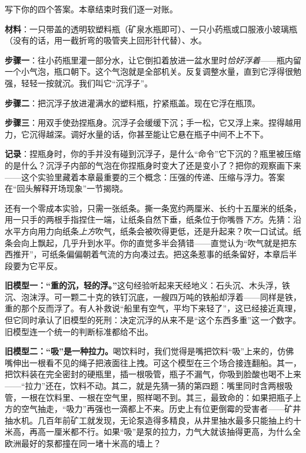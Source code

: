 写下你的四个答案。本章结束时我们逐一对账。


\begin{experiment}
\textbf{材料}：一只带盖的透明软塑料瓶（矿泉水瓶即可）、一只小药瓶或口服液小玻璃瓶（没有的话，用一截折弯的吸管夹上回形针代替）、水。

\textbf{步骤一}：往小药瓶里灌一部分水，让它倒扣着放进一盆水里时\emph{恰好浮着}——瓶内留一个小气泡，瓶口朝下。这个气泡就是全部机关。反复调整水量，直到它浮得很勉强，轻轻一按就沉。我们叫它“沉浮子”。

\textbf{步骤二}：把沉浮子放进灌满水的塑料瓶，拧紧瓶盖。现在它浮在瓶顶。

\textbf{步骤三}：用双手使劲捏瓶身。沉浮子会缓缓下沉；手一松，它又浮上来。捏得越用力，它沉得越深。调好水量的话，你甚至能让它悬在瓶子中间不上不下。

\textbf{记录}：捏瓶身时，你的手并没有碰到沉浮子，是什么“命令”它下沉的？瓶里被压缩的是什么？沉浮子内部的气泡在你捏瓶身时变大了还是变小了？把你的观察画下来——这个实验里藏着本章最重要的三个概念：压强的传递、压缩与浮力。答案在“回头解释开场现象”一节揭晓。
\end{experiment}

还有一个零成本实验，只需一张纸条。撕一条宽约两厘米、长约十五厘米的纸条，用一只手的两根手指捏住一端，让纸条自然下垂，纸条位于你嘴唇\emph{下方}。先猜：沿水平方向用力向纸条\emph{上方}吹气，纸条会被吹得更低，还是升起来？吹一口试试。纸条会向上飘起，几乎升到水平。你的直觉多半会猜错——直觉认为“吹气就是把东西推开”，可纸条偏偏朝着气流的方向凑过去。把这条惹事的纸条留好，本章后半段要为它平反。


\textbf{旧模型一：“重的沉，轻的浮。”}这句经验听起来天经地义：石头沉、木头浮，铁沉、泡沫浮。可一颗二十克的铁钉沉底，一艘四万吨的铁船却浮着——同样是铁，重的那个反而浮了。有人补救说“船里有空气，平均下来轻了”，这已经接近真理，但它同时承认了旧模型的死刑：决定沉浮的从来不是“这个东西多重”这\emph{一个}数字。旧模型连一个统一的判断标准都给不出。

\textbf{旧模型二：“吸”是一种拉力。}喝饮料时，我们觉得是嘴把饮料“吸”上来的，仿佛嘴伸出一根看不见的绳子把液面往上拽。可这个模型在三个场合接连翻船。其一，把饮料装在完全密封的硬瓶里，插一根吸管，瓶子不漏气，你吸到脸酸也喝不上来——“拉力”还在，饮料不动。其二，就是先猜一猜的第四题：嘴里同时含两根吸管，一根在饮料里、一根在空气里，照样喝不到。其三，最致命的：如果把瓶子上方的空气抽走，“吸力”再强也一滴都上不来。历史上有位更倒霉的受害者——矿井抽水机。几百年前矿工就发现，无论泵造得多精良，从井里抽水最多只能抽上约十米高，再高一厘米都不行。如果“吸”是泵的拉力，力气大就该抽得更高，为什么全欧洲最好的泵都撞在同一堵十米高的墙上？

